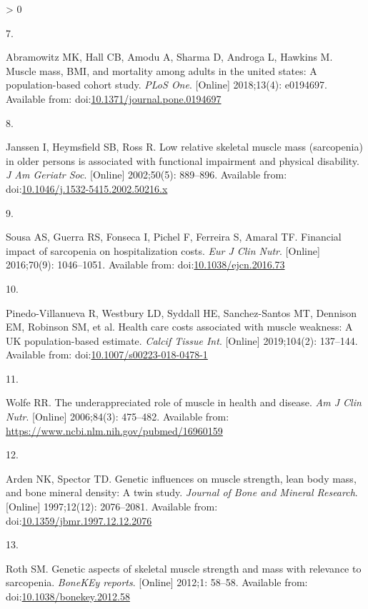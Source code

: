 \documentclass[twoside,10pt]{gihclass} %
\newlength{\cslhangindent}
\newlength{\csllabelwidth}
\newenvironment{CSLReferences}[3] %
 {%
  \setlength{\parindent}{0pt}
  \ifodd #1 \everypar{\setlength{\hangindent}{\cslhangindent}}\ignorespaces\fi
  \ifnum #2 > 0
  \setlength{\parskip}{#2\baselineskip}
  \fi
 }%
 {}
\newcommand{\CSLLeftMargin}[1]{\parbox[t]{\maxof{\widthof{#1}}{\csllabelwidth}}{#1}}
\newcommand{\CSLRightInline}[1]{\parbox[t]{\linewidth}{#1}}
\begin{document}
\begin{CSLReferences}{0}{0}
\leavevmode\hypertarget{ref-RN2516}{}%
\CSLLeftMargin{7. }
\CSLRightInline{Abramowitz MK, Hall CB, Amodu A, Sharma D, Androga L, Hawkins M. Muscle mass, BMI, and mortality among adults in the united states: A population-based cohort study. \emph{PLoS One}. {[}Online{]} 2018;13(4): e0194697. Available from: doi:\href{https://doi.org/10.1371/journal.pone.0194697}{10.1371/journal.pone.0194697}}

\leavevmode\hypertarget{ref-RN2517}{}%
\CSLLeftMargin{8. }
\CSLRightInline{Janssen I, Heymsfield SB, Ross R. Low relative skeletal muscle mass (sarcopenia) in older persons is associated with functional impairment and physical disability. \emph{J Am Geriatr Soc}. {[}Online{]} 2002;50(5): 889--896. Available from: doi:\href{https://doi.org/10.1046/j.1532-5415.2002.50216.x}{10.1046/j.1532-5415.2002.50216.x}}

\leavevmode\hypertarget{ref-RN2532}{}%
\CSLLeftMargin{9. }
\CSLRightInline{Sousa AS, Guerra RS, Fonseca I, Pichel F, Ferreira S, Amaral TF. Financial impact of sarcopenia on hospitalization costs. \emph{Eur J Clin Nutr}. {[}Online{]} 2016;70(9): 1046--1051. Available from: doi:\href{https://doi.org/10.1038/ejcn.2016.73}{10.1038/ejcn.2016.73}}

\leavevmode\hypertarget{ref-RN2184}{}%
\CSLLeftMargin{10. }
\CSLRightInline{Pinedo-Villanueva R, Westbury LD, Syddall HE, Sanchez-Santos MT, Dennison EM, Robinson SM, et al. Health care costs associated with muscle weakness: A UK population-based estimate. \emph{Calcif Tissue Int}. {[}Online{]} 2019;104(2): 137--144. Available from: doi:\href{https://doi.org/10.1007/s00223-018-0478-1}{10.1007/s00223-018-0478-1}}

\leavevmode\hypertarget{ref-RN763}{}%
\CSLLeftMargin{11. }
\CSLRightInline{Wolfe RR. The underappreciated role of muscle in health and disease. \emph{Am J Clin Nutr}. {[}Online{]} 2006;84(3): 475--482. Available from: \url{https://www.ncbi.nlm.nih.gov/pubmed/16960159}}

\leavevmode\hypertarget{ref-RN2526}{}%
\CSLLeftMargin{12. }
\CSLRightInline{Arden NK, Spector TD. Genetic influences on muscle strength, lean body mass, and bone mineral density: A twin study. \emph{Journal of Bone and Mineral Research}. {[}Online{]} 1997;12(12): 2076--2081. Available from: doi:\href{https://doi.org/10.1359/jbmr.1997.12.12.2076}{10.1359/jbmr.1997.12.12.2076}}

\leavevmode\hypertarget{ref-RN2527}{}%
\CSLLeftMargin{13. }
\CSLRightInline{Roth SM. Genetic aspects of skeletal muscle strength and mass with relevance to sarcopenia. \emph{BoneKEy reports}. {[}Online{]} 2012;1: 58--58. Available from: doi:\href{https://doi.org/10.1038/bonekey.2012.58}{10.1038/bonekey.2012.58}}


\end{CSLReferences}
\end{document}
